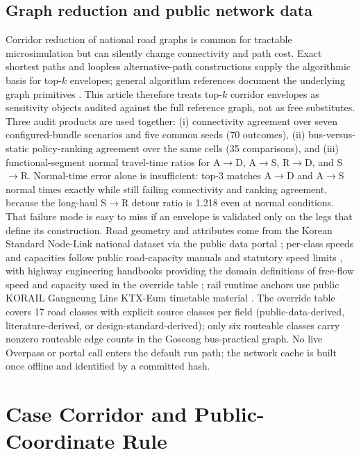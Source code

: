\documentclass{ieeeaccess}
\begin{document}
\subsection{Graph reduction and public network data}
Corridor reduction of national road graphs is common for tractable microsimulation but can silently change connectivity and path cost. Exact shortest paths \cite{b25} and loopless alternative-path constructions \cite{b26} supply the algorithmic basis for top-$k$ envelopes; general algorithm references document the underlying graph primitives \cite{b27}. This article therefore treats top-$k$ corridor envelopes as sensitivity objects audited against the full reference graph, not as free substitutes. Three audit products are used together: (i) connectivity agreement over seven configured-bundle scenarios and five common seeds (70 outcomes), (ii) bus-versus-static policy-ranking agreement over the same cells (35 comparisons), and (iii) functional-segment normal travel-time ratios for A$\rightarrow$D, A$\rightarrow$S, R$\rightarrow$D, and S$\rightarrow$R. Normal-time error alone is insufficient: top-3 matches A$\rightarrow$D and A$\rightarrow$S normal times exactly while still failing connectivity and ranking agreement, because the long-haul S$\rightarrow$R detour ratio is 1.218 even at normal conditions. That failure mode is easy to miss if an envelope is validated only on the legs that define its construction. Road geometry and attributes come from the Korean Standard Node-Link national dataset \cite{b17} via the public data portal \cite{b30}; per-class speeds and capacities follow public road-capacity manuals and statutory speed limits \cite{b2,b3}, with highway engineering handbooks providing the domain definitions of free-flow speed and capacity used in the override table \cite{b7}; rail runtime anchors use public KORAIL Gangneung Line KTX-Eum timetable material \cite{b18}. The override table covers 17 road classes with explicit source classes per field (public-data-derived, literature-derived, or design-standard-derived); only six routeable classes carry nonzero routeable edge counts in the Goseong bus-practical graph. No live Overpass or portal call enters the default run path; the network cache is built once offline and identified by a committed hash.

\section{Case Corridor and Public-Coordinate Rule}
\label{sec:corridor}
\end{document}
